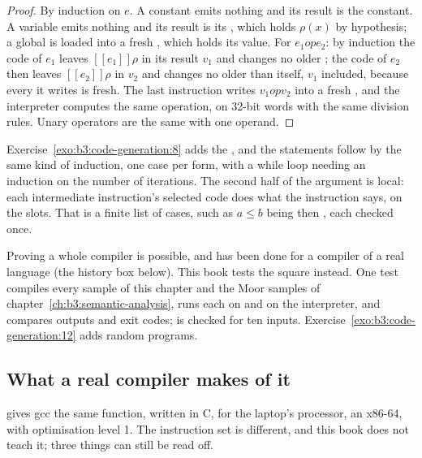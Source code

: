 \begin{proof}
By induction on $e$. A constant emits nothing and its result is the constant. A variable emits nothing and its result is its , which holds $\rho(x)$ by hypothesis; a global is loaded into a fresh , which holds its value. For $e_1 \mathbin{\mathit{op}} e_2$: by induction the code of $e_1$ leaves $[\![e_1]\!]\rho$ in its result $v_1$ and changes no older ; the code of $e_2$ then leaves $[\![e_2]\!]\rho$ in $v_2$ and changes no  older than itself, $v_1$ included, because every  it writes is fresh. The last instruction writes $v_1 \mathbin{\mathit{op}} v_2$ into a fresh , and the interpreter computes the same operation, on 32-bit words with the same division rules. Unary operators are the same with one operand.
\end{proof}

Exercise~\ref{exo:b3:code-generation:8} adds the , and the statements follow by the same kind of induction, one case per form, with a while loop needing an induction on the number of iterations. The second half of the argument is local: each intermediate instruction's selected code does what the instruction says, on the slots. That is a finite list of cases, such as $a \le b$ being  then , each checked once.

Proving a whole compiler  is possible, and has been done for a compiler of a real language (the history box below). %
This book tests the square instead. One test compiles every sample of this chapter and the Moor samples of chapter~\ref{ch:b3:semantic-analysis}, runs each on  and on the interpreter, and compares outputs and exit codes;  is checked for ten inputs. Exercise~\ref{exo:b3:code-generation:12} adds random programs.

\subsection{What a real compiler makes of it}

 gives gcc the same function, written in C, for the laptop's processor, an x86-64, with optimisation level 1. The instruction set is different, and this book does not teach it; three things can still be read off.

